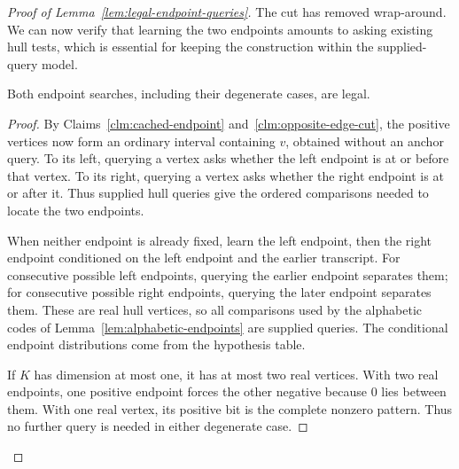 \begin{proof}[Proof of Lemma~\ref{lem:legal-endpoint-queries}]
The cut has removed wrap-around. We can now verify that learning the
two endpoints amounts to asking existing hull tests, which is essential
for keeping the construction within the supplied-query model.

\begin{claim}
\label{clm:supplied-endpoint-comparisons}
Both endpoint searches, including their degenerate cases, are legal.
\end{claim}
\begin{proof}
By Claims~\ref{clm:cached-endpoint} and~\ref{clm:opposite-edge-cut},
the positive vertices now form an ordinary interval containing
$v$, obtained without an anchor query. To its left, querying a vertex asks whether
the left endpoint is at or before that vertex. To its right,
querying a vertex asks whether the right endpoint is at or after it.
Thus supplied hull queries give the ordered comparisons needed to
locate the two endpoints.



When neither endpoint is already fixed, learn the left endpoint,
then the right endpoint conditioned on
the left endpoint and the earlier transcript. For consecutive
possible left endpoints, querying the earlier endpoint separates
them; for consecutive possible right endpoints, querying the later
endpoint separates them. These are real hull vertices, so all
comparisons used by the alphabetic codes of
Lemma~\ref{lem:alphabetic-endpoints} are supplied queries.
The conditional endpoint distributions come from the hypothesis table.

If $K$ has dimension at most one, it has at most two real vertices.
With two real endpoints, one positive endpoint forces the other
negative because $0$ lies between them. With one real vertex,
its positive bit is the complete nonzero pattern.
Thus no further query is needed in either degenerate case.
\end{proof}
\end{proof}
